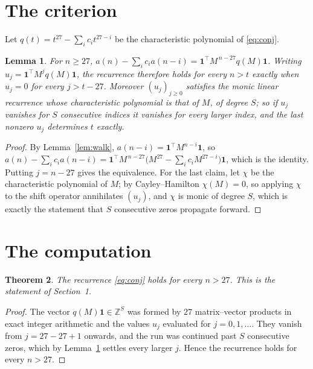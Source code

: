 \documentclass[11pt,a4paper]{article}
\theoremstyle{plain}
\newtheorem{theorem}{Theorem}
\newtheorem{lemma}[theorem]{Lemma}
\theoremstyle{definition}
\begin{document}
\section{The criterion}

Let $q(t)=t^{27}-\sum_i c_i t^{27-i}$ be the characteristic polynomial of
\eqref{eq:conj}.

\begin{lemma}\label{lem:crit}
For $n\ge27$,
$a(n)-\sum_i c_i a(n-i)=\mathbf{1}^{\!\top}M^{\,n-27}q(M)\mathbf{1}$. Writing
$u_j=\mathbf{1}^{\!\top}M^{j}q(M)\mathbf{1}$, the recurrence therefore holds for every
$n>t$ exactly when $u_j=0$ for every $j>t-27$. Moreover $(u_j)_{j\ge0}$ satisfies the
monic linear recurrence whose characteristic polynomial is that of $M$, of degree $S$; so
if $u_j$ vanishes for $S$ consecutive indices it vanishes for every larger index, and the
last nonzero $u_j$ determines $t$ exactly.
\end{lemma}

\begin{proof}
By Lemma~\ref{lem:walk}, $a(n-i)=\mathbf{1}^{\!\top}M^{n-i}\mathbf{1}$, so
$a(n)-\sum_i c_i a(n-i)
=\mathbf{1}^{\!\top}M^{\,n-27}\bigl(M^{27}-\sum_i c_i M^{27-i}\bigr)
\mathbf{1}$, which is the identity. Putting $j=n-27$ gives the equivalence. For the
last claim, let $\chi$ be the characteristic polynomial of $M$; by Cayley--Hamilton
$\chi(M)=0$, so applying $\chi$ to the shift operator annihilates $(u_j)$, and $\chi$ is
monic of degree $S$, which is exactly the statement that $S$ consecutive zeros propagate
forward.
\end{proof}

\section{The computation}

\begin{theorem}
The recurrence \eqref{eq:conj} holds for every $n>27$. This is the statement of
Section~1.
\end{theorem}

\begin{proof}
The vector $q(M)\mathbf{1}\in\mathbb{Z}^{S}$ was formed by $27$ matrix--vector
products in exact integer arithmetic and the values $u_j$ evaluated for
$j=0,1,\dots$. They vanish from $j=27-27+1$ onwards, and the run was continued past
$S$ consecutive zeros, which by Lemma~\ref{lem:crit} settles every larger $j$. Hence the
recurrence holds for every $n>27$.
\end{proof}
\end{document}
